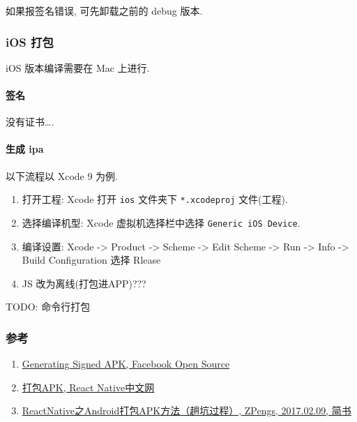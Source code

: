 如果报签名错误, 可先卸载之前的 debug 版本.

\subsubsection{iOS 打包}\label{ios-ux6253ux5305}

iOS 版本编译需要在 Mac 上进行.

\paragraph{签名}\label{ux7b7eux540d}

没有证书\ldots{}.

\paragraph{生成 ipa}\label{ux751fux6210-ipa}

以下流程以 Xcode 9 为例.

\begin{enumerate}
\def\labelenumi{\arabic{enumi}.}
\tightlist
\item
  打开工程: Xcode 打开 \lstinline!ios! 文件夹下 \lstinline!*.xcodeproj!
  文件(工程).
\item
  选择编译机型: Xcode 虚拟机选择栏中选择 \lstinline!Generic iOS Device!.
\item
  编译设置: Xcode -\textgreater{} Product -\textgreater{} Scheme
  -\textgreater{} Edit Scheme -\textgreater{} Run -\textgreater{} Info
  -\textgreater{} Build Configuration 选择 Rlease
\item
  JS 改为离线(打包进APP)???
\end{enumerate}

TODO: 命令行打包

\subsubsection{参考}\label{ux53c2ux8003-1}

\begin{enumerate}
\def\labelenumi{\arabic{enumi}.}
\tightlist
\item
  \href{https://facebook.github.io/react-native/docs/signed-apk-android.html}{Generating
  Signed APK, Facebook Open Source}
\item
  \href{https://reactnative.cn/docs/0.51/signed-apk-android.html}{打包APK,
  React Native中文网}
\item
  \href{https://www.jianshu.com/p/1380d4c8b596}{ReactNative之Android打包APK方法（趟坑过程）,
  ZPengs, 2017.02.09, 简书}
\end{enumerate}

